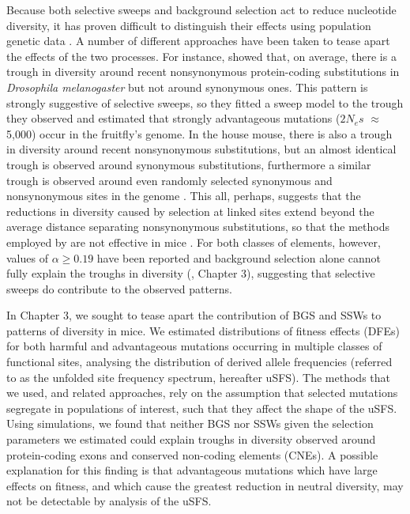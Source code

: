 \documentclass[11pt]{article}
\begin{document}
Because both selective sweeps and background selection act to reduce nucleotide diversity, it has proven difficult to distinguish their effects using population genetic data \citep{RN339}. A number of different approaches have been taken to tease apart the effects of the two processes. For instance, \cite{RN167} showed that, on average, there is a trough in diversity around recent nonsynonymous protein-coding substitutions in \textit{Drosophila melanogaster} but not around synonymous ones. This pattern is strongly suggestive of selective sweeps, so they \citep{RN167} fitted a sweep model to the trough they observed and estimated that strongly advantageous mutations ($2N_es$ $\approx$ 5,000) occur in the fruitfly's genome.  In the house mouse, there is also a trough in diversity around recent nonsynonymous substitutions, but an almost identical trough is observed around synonymous substitutions, furthermore a similar trough is observed around even randomly selected synonymous and nonsynonymous sites in the genome \citep{RN122}. This all, perhaps, suggests that the reductions in diversity caused by selection at linked sites extend beyond the average distance separating nonsynonymous substitutions, so that the methods employed by \cite{RN167} are not effective in mice \citep{RN122}. For both classes of elements, however, values of $\alpha \geq 0.19$ have been reported \citep{RN122} and background selection alone cannot fully explain the troughs in diversity (\citealt{RN122}, Chapter 3), suggesting that selective sweeps do contribute to the observed patterns.

In Chapter 3, we sought to tease apart the contribution of BGS and SSWs to patterns of diversity in mice. We estimated distributions of fitness effects (DFEs) for both harmful and advantageous mutations occurring in multiple classes of functional sites, analysing the distribution of derived allele frequencies (referred to as the unfolded site frequency spectrum, hereafter uSFS). The methods that we used, and related approaches, rely on the assumption that selected mutations segregate in populations of interest, such that they affect the shape of the uSFS. Using simulations, we found that neither BGS nor SSWs given the selection parameters we estimated could explain troughs in diversity observed around protein-coding exons and conserved non-coding elements (CNEs). A possible explanation for this finding is that advantageous mutations which have large effects on fitness, and which cause the greatest reduction in neutral diversity, may not be detectable by analysis of the uSFS. 
\end{document}
